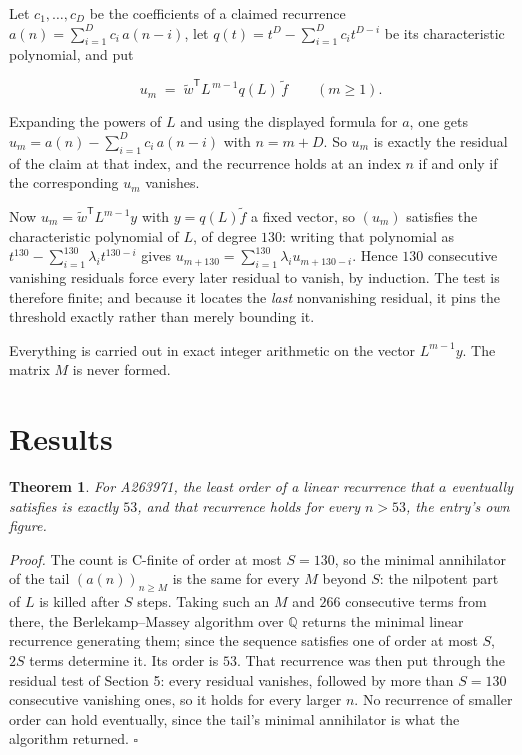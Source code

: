 \documentclass[11pt]{article}
\newtheorem{theorem}{Theorem}
\theoremstyle{definition}
\begin{document}
Let $c_1,\dots,c_D$ be the coefficients of a claimed recurrence $a(n) = \sum_{i=1}^{D} c_i\,a(n-i)$, let $q(t) = t^{D} - \sum_{i=1}^{D} c_i t^{D-i}$ be its characteristic polynomial, and put

\[u_m \;=\; \tilde w^{\mathsf T} L^{\,m-1} q(L)\,\tilde f \qquad (m \ge 1).\]

Expanding the powers of $L$ and using the displayed formula for $a$, one gets $u_m = a(n) - \sum_{i=1}^{D} c_i\,a(n-i)$ with $n = m + D$. So $u_m$ is exactly the residual of the claim at that index, and the recurrence holds at an index $n$ if and only if the corresponding $u_m$ vanishes.

Now $u_m = \tilde w^{\mathsf T} L^{m-1} y$ with $y = q(L)\tilde f$ a fixed vector, so $(u_m)$ satisfies the characteristic polynomial of $L$, of degree $130$: writing that polynomial as $t^{130} - \sum_{i=1}^{130} \lambda_i t^{130-i}$ gives $u_{m+130} = \sum_{i=1}^{130} \lambda_i u_{m+130-i}$. Hence $130$ consecutive vanishing residuals force every later residual to vanish, by induction. The test is therefore finite; and because it locates the {\itshape last} nonvanishing residual, it pins the threshold exactly rather than merely bounding it.

Everything is carried out in exact integer arithmetic on the vector $L^{m-1}y$. The matrix $M$ is never formed.

\section{Results}

\begin{theorem} For A263971, the least order of a linear recurrence that $a$ eventually satisfies is exactly $53$, and that recurrence holds for every $n > 53$, the entry's own figure.\end{theorem}

{\itshape Proof.} The count is C-finite of order at most $S = 130$, so the minimal annihilator of the tail $(a(n))_{n \ge M}$ is the same for every $M$ beyond $S$: the nilpotent part of $L$ is killed after $S$ steps. Taking such an $M$ and $266$ consecutive terms from there, the Berlekamp--Massey algorithm over $\mathbb{Q}$ returns the minimal linear recurrence generating them; since the sequence satisfies one of order at most $S$, $2S$ terms determine it. Its order is $53$. That recurrence was then put through the residual test of Section 5: every residual vanishes, followed by more than $S = 130$ consecutive vanishing ones, so it holds for every larger $n$. No recurrence of smaller order can hold eventually, since the tail's minimal annihilator is what the algorithm returned. $\square$
\end{document}
